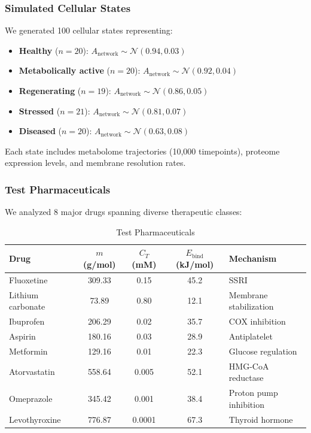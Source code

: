 \documentclass{article}
\begin{document}
\subsubsection{Simulated Cellular States}

We generated 100 cellular states representing:

\begin{itemize}
    \item \textbf{Healthy} ($n=20$): $A_{\text{network}} \sim \mathcal{N}(0.94, 0.03)$
    \item \textbf{Metabolically active} ($n=20$): $A_{\text{network}} \sim \mathcal{N}(0.92, 0.04)$
    \item \textbf{Regenerating} ($n=19$): $A_{\text{network}} \sim \mathcal{N}(0.86, 0.05)$
    \item \textbf{Stressed} ($n=21$): $A_{\text{network}} \sim \mathcal{N}(0.81, 0.07)$
    \item \textbf{Diseased} ($n=20$): $A_{\text{network}} \sim \mathcal{N}(0.63, 0.08)$
\end{itemize}

Each state includes metabolome trajectories (10,000 timepoints), proteome expression levels, and membrane resolution rates.

\subsubsection{Test Pharmaceuticals}

We analyzed 8 major drugs spanning diverse therapeutic classes:

\begin{table}[h]
\centering
\caption{Test Pharmaceuticals}
\begin{tabular}{lcccl}
\toprule
\textbf{Drug} & \textbf{$m$ (g/mol)} & \textbf{$C_T$ (mM)} & \textbf{$E_{\text{bind}}$ (kJ/mol)} & \textbf{Mechanism} \\
\midrule
Fluoxetine & 309.33 & 0.15 & 45.2 & SSRI \\
Lithium carbonate & 73.89 & 0.80 & 12.1 & Membrane stabilization \\
Ibuprofen & 206.29 & 0.02 & 35.7 & COX inhibition \\
Aspirin & 180.16 & 0.03 & 28.9 & Antiplatelet \\
Metformin & 129.16 & 0.01 & 22.3 & Glucose regulation \\
Atorvastatin & 558.64 & 0.005 & 52.1 & HMG-CoA reductase \\
Omeprazole & 345.42 & 0.001 & 38.4 & Proton pump inhibition \\
Levothyroxine & 776.87 & 0.0001 & 67.3 & Thyroid hormone \\
\bottomrule
\end{tabular}
\end{table}
\end{document}
